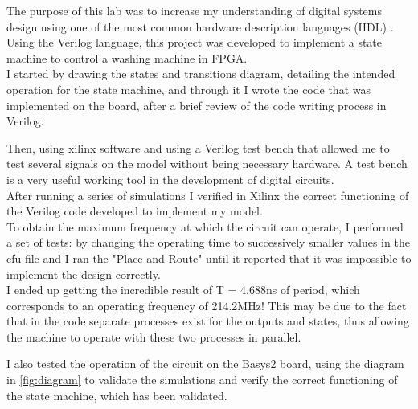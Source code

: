 The purpose of this lab was to increase my understanding of digital systems design using one of the most common hardware description languages ​​(HDL) . \\

Using the Verilog language, this project was developed to implement a state machine to control a washing machine in FPGA. \\

I started by drawing the states and transitions diagram, detailing the intended operation for the state machine, and through it I wrote the code that was implemented on the board, after a brief review of the code writing process in Verilog. \par

Then, using xilinx software and using a Verilog test bench that allowed me to test several signals on the model without being necessary hardware. A test bench is a very useful working tool in the development of digital circuits. \\

After running a series of simulations I verified in Xilinx the correct functioning of the Verilog code developed to implement my model.   \\

To obtain the maximum frequency at which the circuit can operate, I performed a set of tests: by changing the operating time to successively smaller values ​​in the cfu file and I  ran the "Place and Route" until it reported that it was impossible to implement the design correctly. \\

I ended up getting the incredible result of T = 4.688ns of period, which corresponds to an operating frequency of 214.2MHz! This may be due to the fact that in the code separate processes exist for the outputs and states, thus allowing the machine to operate with these two processes in parallel.

I also tested the operation of the circuit on the Basys2 board, using the diagram in \autoref{fig:diagram} to validate the simulations and verify the correct functioning of the state machine, which has been validated.
